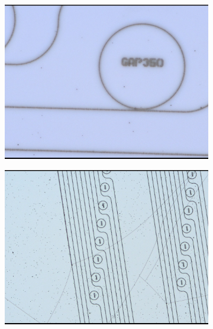 \begin{figure}
    \centering
    \begin{subfigure}[b]{0.45\textwidth}
    \includegraphics[width=\textwidth]{imgs/jpg/LS_ac}
    \caption{}
    \end{subfigure}
    \begin{subfigure}[b]{0.45\textwidth}
    \includegraphics[width=\textwidth]{imgs/jpg/LS_tc}
    \caption{}
    \end{subfigure}    
    \begin{subfigure}[b]{0.45\textwidth}

\end{subfigure}
\end{figure}
